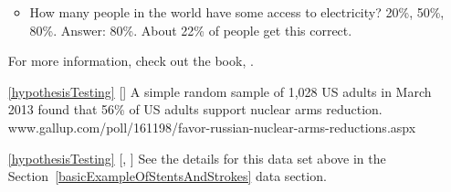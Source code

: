 \begin{itemize}
\begin{itemize}
    \item
        How many people in the world have some access
        to electricity? 20\%, 50\%, 80\%.
        Answer: 80\%.
        About 22\% of people get this correct.
    \end{itemize}
    For more information, check out the book,
    .
\item[\ref{hypothesisTesting}]
    [\datalink{nuclear\_survey}]
    A simple random sample of 1,028 US adults in March 2013
    found that 56\% of US adults support nuclear arms reduction.
        {www.gallup.com/poll/161198/favor-russian-nuclear-arms-reductions.aspx}
\item[\ref{hypothesisTesting}]
    [\datalink{stent30}, \datalink{stent365}]
    See the details for this data set above
    in the Section~\ref{basicExampleOfStentsAndStrokes}
    data section.

\end{itemize}







\section{}
\label{ch_inference_for_props_data}

